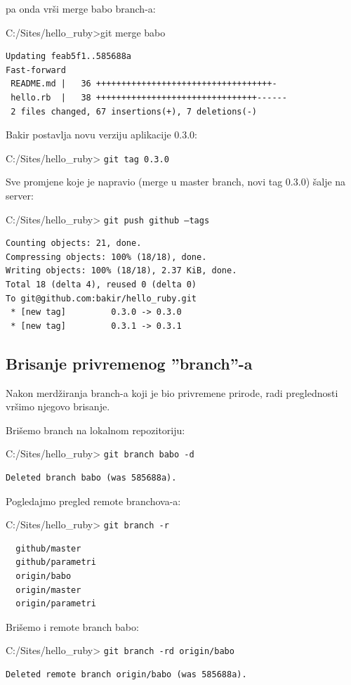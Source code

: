 \documentclass[times, utf8, seminar]{fit}
\begin{document}
pa onda vrši merge babo branch-a:

C:/Sites/hello\_ruby>git merge babo
\begin{lstlisting}
Updating feab5f1..585688a
Fast-forward
 README.md |   36 +++++++++++++++++++++++++++++++++++-
 hello.rb  |   38 ++++++++++++++++++++++++++++++++------
 2 files changed, 67 insertions(+), 7 deletions(-)
\end{lstlisting}

Bakir postavlja novu verziju aplikacije 0.3.0:

C:/Sites/hello\_ruby> \texttt{git tag 0.3.0}

Sve promjene koje je napravio (merge u master branch, novi tag 0.3.0) šalje na server:

C:/Sites/hello\_ruby> \texttt{git push github --tags}
\begin{lstlisting}
Counting objects: 21, done.
Compressing objects: 100% (18/18), done.
Writing objects: 100% (18/18), 2.37 KiB, done.
Total 18 (delta 4), reused 0 (delta 0)
To git@github.com:bakir/hello_ruby.git
 * [new tag]         0.3.0 -> 0.3.0
 * [new tag]         0.3.1 -> 0.3.1
\end{lstlisting}

\subsection{Brisanje privremenog ''branch''-a }

Nakon merdžiranja branch-a koji je bio privremene prirode, radi preglednosti vršimo njegovo brisanje.

Brišemo branch na lokalnom repozitoriju:

C:/Sites/hello\_ruby> \texttt{git branch babo -d}
\begin{lstlisting}
Deleted branch babo (was 585688a).
\end{lstlisting}

Pogledajmo pregled remote branchova-a:

C:/Sites/hello\_ruby> \texttt{git branch -r}
\begin{lstlisting}
  github/master
  github/parametri
  origin/babo
  origin/master
  origin/parametri
\end{lstlisting}

Brišemo i remote branch babo:

C:/Sites/hello\_ruby> \texttt{git branch -rd origin/babo}
\begin{lstlisting}
Deleted remote branch origin/babo (was 585688a).
\end{lstlisting}
\end{document}
